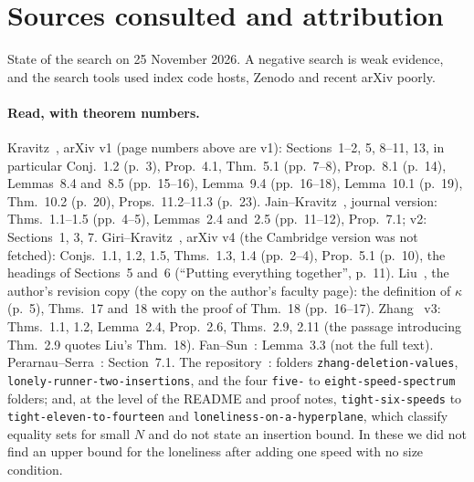 \documentclass[11pt]{article}
\theoremstyle{definition}
\theoremstyle{remark}
\begin{document}
\section{Sources consulted and attribution}\label{sec:prior}
State of the search on 25 November 2026. A negative search is weak evidence, and the search tools used index code hosts, Zenodo and recent arXiv poorly.

\paragraph{Read, with theorem numbers.}
Kravitz~\cite{K}, arXiv v1 (page numbers above are v1): Sections~1--2, 5, 8--11, 13, in particular Conj.~1.2 (p.~3), Prop.~4.1, Thm.~5.1 (pp.~7--8), Prop.~8.1 (p.~14), Lemmas~8.4 and~8.5 (pp.~15--16), Lemma~9.4 (pp.~16--18), Lemma~10.1 (p.~19), Thm.~10.2 (p.~20), Props.~11.2--11.3 (p.~23). Jain--Kravitz~\cite{JK}, journal version: Thms.~1.1--1.5 (pp.~4--5), Lemmas~2.4 and~2.5 (pp.~11--12), Prop.~7.1; v2: Sections~1, 3, 7. Giri--Kravitz~\cite{GK}, arXiv v4 (the Cambridge version was not fetched): Conjs.~1.1, 1.2, 1.5, Thms.~1.3, 1.4 (pp.~2--4), Prop.~5.1 (p.~10), the headings of Sections~5 and~6 (``Putting everything together'', p.~11). Liu~\cite{L}, the author's revision copy (the copy on the author's faculty page): the definition of $\kappa$ (p.~5), Thms.~17 and~18 with the proof of Thm.~18 (pp.~16--17). Zhang~\cite{Z} v3: Thms.~1.1, 1.2, Lemma~2.4, Prop.~2.6, Thms.~2.9, 2.11 (the passage introducing Thm.~2.9 quotes Liu's Thm.~18). Fan--Sun~\cite{FS}: Lemma~3.3 (not the full text). Perarnau--Serra~\cite{PS}: Section~7.1. The repository~\cite{R1337}: folders \texttt{zhang-deletion-values}, \texttt{lonely-runner-two-insertions}, and the four \texttt{five-} to \texttt{eight-speed-spectrum} folders; and, at the level of the README and proof notes, \texttt{tight-six-speeds} to \texttt{tight-eleven-to-fourteen} and \texttt{loneliness-on-a-hyperplane}, which classify equality sets for small $N$ and do not state an insertion bound. In these we did not find an upper bound for the loneliness after adding one speed with no size condition.
\end{document}
